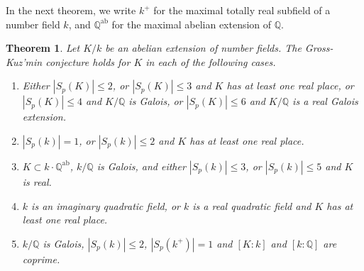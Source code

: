 \documentclass[12pt]{amsart}
\newcommand{\Q}{\mathbb{Q}}
\newcommand{\ab}{\textrm{ab}}
\theoremstyle{defstyle}
\theoremstyle{thmstyle}
\newtheorem{theorem}[subsubsection]{Theorem}
\begin{document}
	In the next theorem, we write $k^+$ for the maximal totally real subfield of a number field $k$, and $\Q^\ab$ for the maximal abelian extension of $\Q$.
	\begin{theorem}\label{thm:list_new_cases_gk}
		Let $K/k$ be an abelian extension of number fields. The Gross-Kuz'min conjecture holds for $K$ in each of the following cases.
		\begin{enumerate}[label=(\alph*)]
			\item Either $|S_p(K)|\leq 2$, or $|S_p(K)|\leq 3$ and $K$ has at least one real place, or $|S_p(K)|\leq 4$ and $K/\Q$ is Galois, or $|S_p(K)|\leq 6$ and $K/\Q$ is a real Galois extension.
			\item $|S_p(k)|=1$, or $|S_p(k)|\leq 2$ and $K$ has at least one real place.
			\item $K\subset k\cdot \Q^\ab$, $k/\Q$ is Galois, and either $|S_p(k)|\leq 3$, or $|S_p(k)|\leq 5$ and $K$ is real.
			\item $k$ is an imaginary quadratic field, or $k$ is a real quadratic field and $K$ has at least one real place.
			\item $k/\Q$ is Galois, $|S_p(k)|\leq 2$, $|S_p(k^+)|=1$ and $[K:k]$ and $[k:\Q]$ are coprime.
		\end{enumerate}
	\end{theorem}
\end{document}
